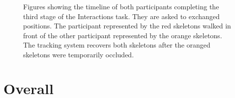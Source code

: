 \begin{figure}[!h]
  \centering


  \caption{Figures showing the timeline of both participants completing the third stage of the Interactions task. They are asked to exchanged positions. The participant represented by the red skeletons walked in front of the other participant represented by the orange skeletons. The tracking system recovers both skeletons after the oranged skeletons were temporarily occluded.}
  
  \label{fig:results_swap_timeline}
\end{figure}

\section{Overall}
\label{sec:results_overall}

